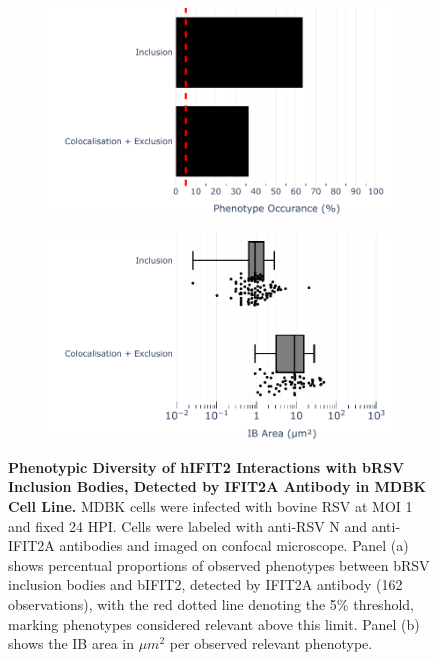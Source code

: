 \begin{figure}
    \begin{subfigure}{0.495\textwidth}
        \caption{}
        \includegraphics[width=1\linewidth]{08. Chapter 3/Figs/02. Infection/02. IFIT2/01. IFIT2A/13. bar_i2a_mdbk.pdf} 
    \end{subfigure}
    \begin{subfigure}{0.495\textwidth}
        \caption{}
        \includegraphics[width=1\linewidth]{08. Chapter 3/Figs/02. Infection/02. IFIT2/01. IFIT2A/14. box_i2a_mdbk.pdf}
    \end{subfigure}
    \caption[Phenotypic Diversity of hIFIT2 Interactions with bRSV Inclusion Bodies, Detected by IFIT2A Antibody in MDBK Cell Line.]{\textbf{Phenotypic Diversity of hIFIT2 Interactions with bRSV Inclusion Bodies, Detected by IFIT2A Antibody in MDBK Cell Line.} MDBK cells were infected with bovine RSV at MOI 1 and fixed 24 HPI. Cells were labeled with anti-RSV N and anti-IFIT2A antibodies and imaged on confocal microscope. Panel (a) shows percentual proportions of observed phenotypes between bRSV inclusion bodies and bIFIT2, detected by IFIT2A antibody (162 observations), with the red dotted line denoting the 5\% threshold, marking phenotypes considered relevant above this limit. Panel (b) shows the IB area in \(\mu m^2\) per observed relevant phenotype.}
    \label{fig:Phenotypic Diversity of hIFIT2 Interactions with bRSV Inclusion Bodies, Detected by IFIT2A Antibody in MDBK Cell Line}
\end{figure}

